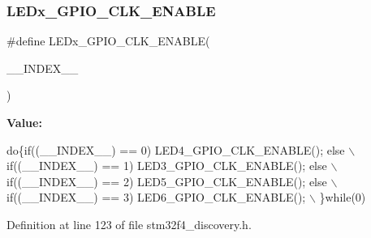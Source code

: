 \subsubsection{\texorpdfstring{L\+E\+Dx\+\_\+\+G\+P\+I\+O\+\_\+\+C\+L\+K\+\_\+\+E\+N\+A\+B\+LE}{LEDx\_GPIO\_CLK\_ENABLE}}
{\footnotesize\ttfamily \#define L\+E\+Dx\+\_\+\+G\+P\+I\+O\+\_\+\+C\+L\+K\+\_\+\+E\+N\+A\+B\+LE(\begin{DoxyParamCaption}\item[{}]{\+\_\+\+\_\+\+I\+N\+D\+E\+X\+\_\+\+\_\+ }\end{DoxyParamCaption})}

{\bfseries Value\+:}
\begin{DoxyCode}
\textcolor{keywordflow}{do}\{\textcolor{keywordflow}{if}((\_\_INDEX\_\_) == 0) LED4\_GPIO\_CLK\_ENABLE(); else \(\backslash\)
                                           if((\_\_INDEX\_\_) == 1) LED3\_GPIO\_CLK\_ENABLE(); else \(\backslash\)
                                           if((\_\_INDEX\_\_) == 2) LED5\_GPIO\_CLK\_ENABLE(); else \(\backslash\)
                                           if((\_\_INDEX\_\_) == 3) LED6\_GPIO\_CLK\_ENABLE(); \(\backslash\)
                                           \}while(0)
\end{DoxyCode}


Definition at line 123 of file stm32f4\+\_\+discovery.\+h.

